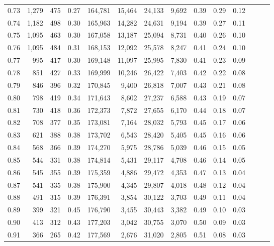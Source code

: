 \begin{tabular}{rrrrrrrrrrrrrr}
0.73 &  1,279 &    475 &  0.27 &  164,781 &   15,464 &  24,133 &   9,692 &  0.39 &  0.29 &      0.12 \\
0.74 &  1,182 &    498 &  0.30 &  165,963 &   14,282 &  24,631 &   9,194 &  0.39 &  0.27 &      0.11 \\
0.75 &  1,095 &    463 &  0.30 &  167,058 &   13,187 &  25,094 &   8,731 &  0.40 &  0.26 &      0.10 \\
0.76 &  1,095 &    484 &  0.31 &  168,153 &   12,092 &  25,578 &   8,247 &  0.41 &  0.24 &      0.10 \\
0.77 &    995 &    417 &  0.30 &  169,148 &   11,097 &  25,995 &   7,830 &  0.41 &  0.23 &      0.09 \\
0.78 &    851 &    427 &  0.33 &  169,999 &   10,246 &  26,422 &   7,403 &  0.42 &  0.22 &      0.08 \\
0.79 &    846 &    396 &  0.32 &  170,845 &    9,400 &  26,818 &   7,007 &  0.43 &  0.21 &      0.08 \\
0.80 &    798 &    419 &  0.34 &  171,643 &    8,602 &  27,237 &   6,588 &  0.43 &  0.19 &      0.07 \\
0.81 &    730 &    418 &  0.36 &  172,373 &    7,872 &  27,655 &   6,170 &  0.44 &  0.18 &      0.07 \\
0.82 &    708 &    377 &  0.35 &  173,081 &    7,164 &  28,032 &   5,793 &  0.45 &  0.17 &      0.06 \\
0.83 &    621 &    388 &  0.38 &  173,702 &    6,543 &  28,420 &   5,405 &  0.45 &  0.16 &      0.06 \\
0.84 &    568 &    366 &  0.39 &  174,270 &    5,975 &  28,786 &   5,039 &  0.46 &  0.15 &      0.05 \\
0.85 &    544 &    331 &  0.38 &  174,814 &    5,431 &  29,117 &   4,708 &  0.46 &  0.14 &      0.05 \\
0.86 &    545 &    355 &  0.39 &  175,359 &    4,886 &  29,472 &   4,353 &  0.47 &  0.13 &      0.04 \\
0.87 &    541 &    335 &  0.38 &  175,900 &    4,345 &  29,807 &   4,018 &  0.48 &  0.12 &      0.04 \\
0.88 &    491 &    315 &  0.39 &  176,391 &    3,854 &  30,122 &   3,703 &  0.49 &  0.11 &      0.04 \\
0.89 &    399 &    321 &  0.45 &  176,790 &    3,455 &  30,443 &   3,382 &  0.49 &  0.10 &      0.03 \\
0.90 &    413 &    312 &  0.43 &  177,203 &    3,042 &  30,755 &   3,070 &  0.50 &  0.09 &      0.03 \\
0.91 &    366 &    265 &  0.42 &  177,569 &    2,676 &  31,020 &   2,805 &  0.51 &  0.08 &      0.03 \\

\end{tabular}
